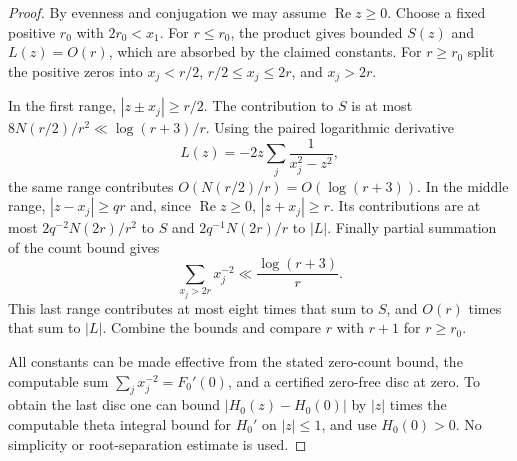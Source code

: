 \begin{proof}
By evenness and conjugation we may assume
$\operatorname{Re}z\ge0$. Choose a fixed positive $r_0$ with
$2r_0<x_1$. For $r\le r_0$, the product gives bounded $S(z)$
and $L(z)=O(r)$, which are absorbed by the claimed constants.
For $r\ge r_0$ split the positive zeros into
$x_j<r/2$, $r/2\le x_j\le2r$, and $x_j>2r$.

In the first range, $|z\pm x_j|\ge r/2$. The contribution to
$S$ is at most $8N(r/2)/r^2\ll\log(r+3)/r$.
Using the paired logarithmic derivative
\[
                  L(z)=-2z\sum_j\frac1{x_j^2-z^2},
\]
the same range contributes $O(N(r/2)/r)=O(\log(r+3))$.
In the middle range, $|z-x_j|\ge qr$ and, since
$\operatorname{Re}z\ge0$, $|z+x_j|\ge r$.
Its contributions are at most
$2q^{-2}N(2r)/r^2$ to $S$ and
$2q^{-1}N(2r)/r$ to $|L|$.
Finally partial summation of the count bound gives
\[
             \sum_{x_j>2r}x_j^{-2}
                          \ll\frac{\log(r+3)}r.
\]
This last range contributes at most eight times that sum to
$S$, and $O(r)$ times that sum to $|L|$.
Combine the bounds and compare $r$ with $r+1$ for $r\ge r_0$.

All constants can be made effective from the stated zero-count
bound, the computable sum $\sum_jx_j^{-2}=F_0'(0)$, and a
certified zero-free disc at zero. To obtain the last disc one
can bound $|H_0(z)-H_0(0)|$ by $|z|$ times the computable theta
integral bound for $H_0'$ on $|z|\le1$, and use $H_0(0)>0$.
No simplicity or root-separation estimate is used.
\end{proof}

